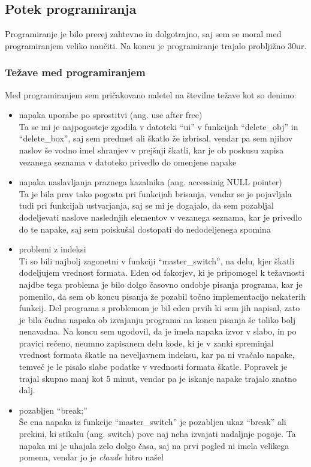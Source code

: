 \documentclass[12pt, a4paper, notitlepage]{article}
\begin{document}
    \subsection{Potek programiranja}
    Programiranje je bilo precej zahtevno in dolgotrajno, saj sem se moral med programiranjem veliko naučiti. Na koncu je programiranje trajalo probljižno 30ur.
      \subsubsection{Težave med programiranjem}
      Med programiranjem sem pričakovano naletel na številne težave kot so denimo:
      \begin{itemize}
        \item napaka uporabe po sprostitvi (ang. use after free)\\ Ta se mi je najpogosteje zgodila v datoteki ``ui'' v funkcijah ``delete\_obj'' in ``delete\_box'', saj sem predmet ali škatlo že izbrisal, vendar pa sem njihov naslov še vodno imel shranjev v prejšnji škatli, kar je ob poskusu zapisa vezanega seznama v datoteko privedlo do omenjene napake
        \item napaka naslavljanja praznega kazalnika (ang. accessinig NULL pointer)\\ Ta je bila prav tako pogosta pri funkcijah brisanja, vendar se je pojavljala tudi pri funkcijah ustvarjanja, saj se mi je dogajalo, da sem pozabljal dodeljevati naslove naslednjih elementov v vezanega seznama, kar je privedlo do te napake, saj sem poiskušal dostopati do nedodeljenega spomina
        \item problemi z indeksi\\ Ti so bili najbolj zagonetni v funkciji ``master\_switch'', na delu, kjer škatli dodeljujem vrednost formata. Eden od fakorjev, ki je pripomogel k težavnosti najdbe tega problema je bilo dolgo časovno ondobje pisanja programa, kar je pomenilo, da sem ob koncu pisanja že pozabil točno implementacijo nekaterih funkcij. Del programa s problemom je bil eden prvih ki sem jih napisal, zato je bila čudna napaka ob izvajanju programa na koncu pisanja še toliko bolj nenavadna. Na koncu sem ugodovil, da je imela napaka izvor v slabo, in po pravici rečeno, neumno zapisanem delu kode, ki je v zanki spreminjal vrednost formata škatle na neveljavnem indeksu, kar pa ni vračalo napake, temveč je le pisalo slabe podatke v vrednosti formata škatle. Popravek je trajal skupno manj kot 5 minut, vendar pa je iskanje napake trajalo znatno dalj.
        \item pozabljen ``break;''\\ Še ena napaka iz funkcije ``master\_switch'' je pozabljen ukaz ``break'' ali prekini, ki stikalu (ang. switch) pove naj neha izvajati nadaljnje pogoje. Ta napaka mi je uhajala zelo dolgo časa, saj na prvi pogled ni imela velikega pomena, vendar jo je \textit{claude} hitro našel

\end{itemize}
\end{document}
